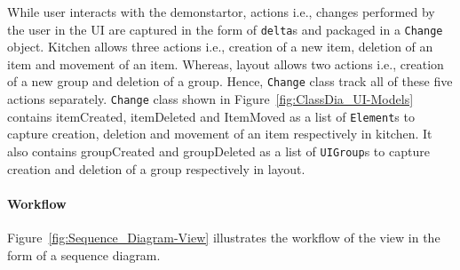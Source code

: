 While user interacts with the demonstartor, actions i.e., changes performed by the user in the UI are captured in the form of \texttt{delta}s and packaged in a \texttt{Change} object. Kitchen allows three actions i.e., creation of a new item, deletion of an item and movement of an item. Whereas, layout allows two actions i.e., creation of a new group and deletion of a group. Hence, \texttt{Change} class track all of these five actions separately. \texttt{Change} class shown in Figure~\ref{fig:ClassDia_UI-Models} contains itemCreated, itemDeleted and ItemMoved as a list of \texttt{Element}s to capture creation, deletion and movement of an item respectively in kitchen. It also contains groupCreated and groupDeleted as a list of \texttt{UIGroup}s to capture creation and deletion of a group respectively in layout.

\paragraph{Workflow}
Figure~\ref{fig:Sequence_Diagram-View} illustrates the workflow of the view in the form of a sequence diagram.

